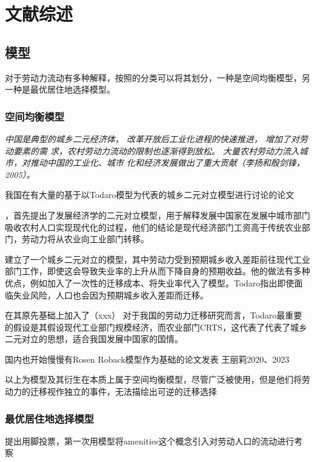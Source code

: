 \documentclass[a4paper,10pt]{article}
\begin{document}
\section{文献综述}



\subsection{模型}
对于劳动力流动有多种解释，按照\cite{jiaEconomicsInternalMigration2023}的分类可以将其划分，一种是空间均衡模型，另一种是最优居住地选择模型。

\subsubsection{空间均衡模型}
\textit{中国是典型的城乡二元经济体， 改革开放后工业化进程的快速推进， 增加了对劳动要素的需 求，农村劳动力流动的限制也逐渐得到放松。 大量农村劳动力流入城市，对推动中国的工业化、城市 化和经济发展做出了重大贡献（李扬和殷剑锋，2005）。}

我国在有大量的基于以Todaro模型为代表的城乡二元对立模型进行讨论的论文

\cite{lewisEconomicDevelopmentUnlimited1954}，\cite{ranisTheoryEconomicDevelopment1961}首先提出了发展经济学的二元对立模型，用于解释发展中国家在发展中城市部门吸收农村人口实现现代化的过程，他们的结论是现代经济部门工资高于传统农业部门，劳动力将从农业向工业部门转移。

\cite{todaroModelLaborMigration1969}建立了一个城乡二元对立的模型，其中劳动力受到预期城乡收入差距前往现代工业部门工作，即使这会导致失业率的上升从而下降自身的预期收益。他的做法有多种优点，例如加入了一次性的迁移成本、将失业率代入了模型。Todaro指出即使面临失业风险，人口也会因为预期城乡收入差距而迁移。

\cite{harrisMigrationUnemploymentDevelopment1970}在其原先基础上加入了（xxx）
对于我国的劳动力迁移研究而言，Todaro最重要的假设是其假设现代工业部门规模经济，而农业部门CRTS，这代表了代表了城乡二元对立的思想，适合我国发展中国家的国情。


\cite{rosenWageBasedIndexesUrban1979,robackWagesRentsQuality1982,robackWagesRentsAmenities1988}
国内也开始慢慢有Rosen Roback模型作为基础的论文发表
王丽莉2020、2023

以上为模型及其衍生在本质上属于空间均衡模型，尽管广泛被使用，但是他们将劳动力的迁移视作独立的事件，无法描绘出可逆的迁移选择

\subsubsection{最优居住地选择模型}
\cite{tieboutPureTheoryLocal1956}提出用脚投票，第一次用模型将amenities这个概念引入对劳动人口的流动进行考察
\end{document}
